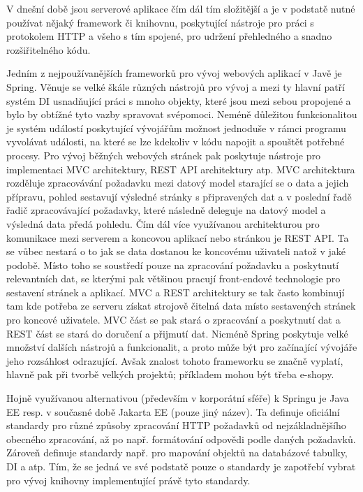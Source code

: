 		V dnešní době jsou serverové aplikace čím dál tím složitější a je v podstatě nutné používat nějaký framework
		či knihovnu, poskytující nástroje pro práci s protokolem \Ac{HTTP} a všeho s tím spojené, pro udržení
		přehledného a snadno rozšiřitelného kódu.

		Jedním z nejpoužívanějších frameworků pro vývoj webových aplikací v Javě je Spring.
		Věnuje se velké škále různých nástrojů pro vývoj a mezi ty hlavní patří systém \noindent\Ac{DI} usnadňující práci s
		mnoho objekty, které jsou mezi sebou propojené a bylo by obtížné tyto vazby spravovat svépomoci.
		Neméně důležitou funkcionalitou je systém událostí poskytující vývojářům možnost jednoduše v rámci programu vyvolávat
		události, na které se lze kdekoliv v kódu napojit a spouštět potřebné procesy. \cite{spring_framework_documentation_core}
		Pro vývoj běžných webových stránek pak poskytuje nástroje pro implementaci \noindent\Ac{MVC}
		architektury, \noindent\Ac{REST} API architektury atp. \cite{spring_framework_documentaiton_web}
		\Ac{MVC} architektura rozděluje zpracovávání požadavku mezi datový model starající se o data a jejich přípravu,
		pohled sestavují výsledné stránky s připravených dat a v poslední řadě řadič zpracovávající požadavky,
		které následně deleguje na datový model a výsledná data předá pohledu. \cite{mvc}
		Čím dál více využívanou architekturou pro komunikace mezi serverem a koncovou aplikací nebo stránkou je \Ac{REST} API.
		Ta se vůbec nestará o to jak se data dostanou ke koncovému uživateli natož v jaké podobě.
		Místo toho se soustředí pouze na zpracování požadavku a poskytnutí relevantních dat, se kterými pak
		většinou pracují front-endové technologie pro sestavení stránek a aplikací. \cite{restfulapi}
		\ac{MVC} a \ac{REST} architektury se tak často kombinují tam kde potřeba ze serveru získat strojově čitelná data
		místo sestavených stránek pro koncové uživatele. \ac{MVC} část se pak stará o zpracování a poskytnutí dat
		a \ac{REST} část se stará do doručení a přijmutí dat.
		Nicméně Spring poskytuje velké množství dalších nástrojů a funkcionalit, a proto může být pro začínající vývojáře
		jeho rozsáhlost odrazující.
		Avšak znalost tohoto frameworku se značně vyplatí, hlavně pak při tvorbě velkých projektů; příkladem mohou být
		třeba e-shopy.

		Hojně využívanou alternativou (především v korporátní sféře) k Springu je Java EE resp. v současné době
		Jakarta EE (pouze jiný název).
		Ta definuje oficiální standardy pro různé způsoby zpracování \Ac{HTTP} požadavků od nejzákladnějšího obecného
		zpracování, až po např. formátování odpovědi podle daných požadavků.
		Zároveň definuje standardy např. pro mapování objektů na databázové tabulky, \Ac{DI} a atp.
		Tím, že se jedná ve své podstatě pouze o standardy je zapotřebí vybrat pro vývoj knihovny implementující právě tyto
		standardy. \cite{jakarta_ee}


